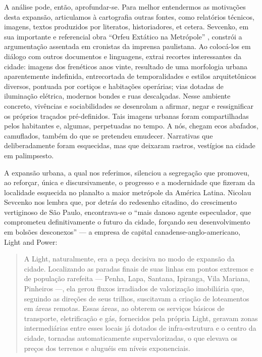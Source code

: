 \begin{refsection}
    A análise pode, então, aprofundar-se. Para melhor entendermos as motivações desta expansão, articulamos à cartografia outras fontes, como relatórios técnicos, imagens, textos produzidos por literatos, historiadores, et cetera. Sevcenko, em sua importante e referencial obra ``Orfeu Extático na Metrópole'' \citeyear{Sevcenko2014Orfeu}, constrói a argumentação assentada em cronistas da imprensa paulistana. Ao colocá-los em diálogo com outros documentos e linguagens, extrai recortes interessantes da cidade: imagens dos frenéticos anos vinte, resultado de uma morfologia urbana aparentemente indefinida, entrecortada de temporalidades e estilos arquitetônicos diversos, pontuada por cortiços e habitações operárias; vias dotadas de iluminação elétrica, modernos bondes e ruas descalçadas. Nesse ambiente concreto, vivências e sociabilidades se desenrolam a afirmar, negar e ressignificar os próprios traçados pré-definidos. Tais imagens urbanas foram compartilhadas pelos habitantes e, algumas, perpetuadas no tempo. A nós, chegam ecos abafados, camuflados, também do que se pretendeu emudecer. Narrativas que deliberadamente foram esquecidas, mas que deixaram rastros, vestígios na cidade em palimpsesto.  

    A expansão urbana, a qual nos referimos, silenciou a segregação que promoveu, ao reforçar, única e discursivamente, o progresso e a modernidade que fizeram da localidade esquecida no planalto a maior metrópole da América Latina. Nicolau Sevcenko nos lembra que, por detrás do redesenho citadino, do crescimento vertiginoso de São Paulo, encontrava-se o ``mais danoso agente especulador, que comprometeu definitivamente o futuro da cidade, forçando seu desenvolvimento em bolsões desconexos'' \cite[p.~122]{Sevcenko2014Orfeu} --- a empresa de capital canadense-anglo-americano, Light and Power: 

    \begin{quotation}
        A Light, naturalmente, era a peça decisiva no modo de expansão da cidade. Localizando as paradas finais de suas linhas em pontos extremos e de população rarefeita --- Penha, Lapa, Santana, Ipiranga, Vila Mariana, Pinheiros ---, ela gerou fluxos irradiados de valorização imobiliária que, seguindo as direções de seus trilhos, suscitavam a criação de loteamentos em áreas remotas. Essas áreas, ao obterem os serviços básicos de transporte, eletrificação e gás, fornecidos pela própria Light, geravam zonas intermediárias entre esses locais já dotados de infra-estrutura e o centro da cidade, tornadas automaticamente supervalorizadas, o que elevava os preços dos terrenos e aluguéis em níveis exponenciais. \cite[p.~123--124]{Sevcenko2014Orfeu}
    \end{quotation}


\end{refsection}
